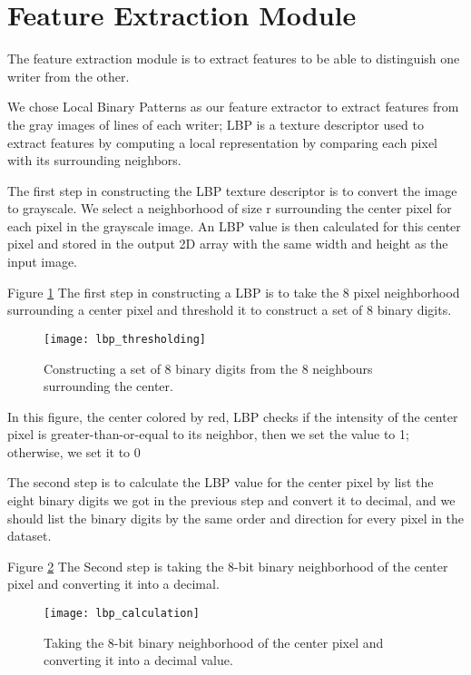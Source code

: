 \section{Feature Extraction Module}
The feature extraction module is to extract features to be able to distinguish one writer from the other.

We chose Local Binary Patterns as our feature extractor to extract features from the gray images of lines of each writer; LBP is a texture descriptor used to extract features by computing a local representation by comparing each pixel with its surrounding neighbors.

The first step in constructing the LBP texture descriptor is to convert the image to grayscale. We select a neighborhood of size r surrounding the center pixel for each pixel in the grayscale image. An LBP value is then calculated for this center pixel and stored in the output 2D array with the same width and height as the input image.

Figure \ref{fig:lbp_thresholding} The first step in constructing a LBP is to take the 8 pixel neighborhood surrounding a center pixel and threshold it to construct a set of 8 binary digits.

\begin{figure}
    \centering
    \texttt{[image: lbp\_thresholding]}
    \caption{Constructing a set of 8 binary digits from the 8 neighbours surrounding the center.}
    \label{fig:lbp_thresholding}
\end{figure}

In this figure, the center colored by red, LBP checks if the intensity of the center pixel is greater-than-or-equal to its neighbor, then we set the value to 1; otherwise, we set it to 0

The second step is to calculate the LBP value for the center pixel by list the eight binary digits we got in the previous step and convert it to decimal, and we should list the binary digits by the same order and direction for every pixel in the dataset.

Figure \ref{fig:lbp_calculation} The Second step is taking the 8-bit binary neighborhood of the center pixel and converting it into a decimal.

\begin{figure}
    \centering
    \texttt{[image: lbp\_calculation]}
    \caption{Taking the 8-bit binary neighborhood of the center pixel and converting it into a decimal value.}
    \label{fig:lbp_calculation}
\end{figure}


